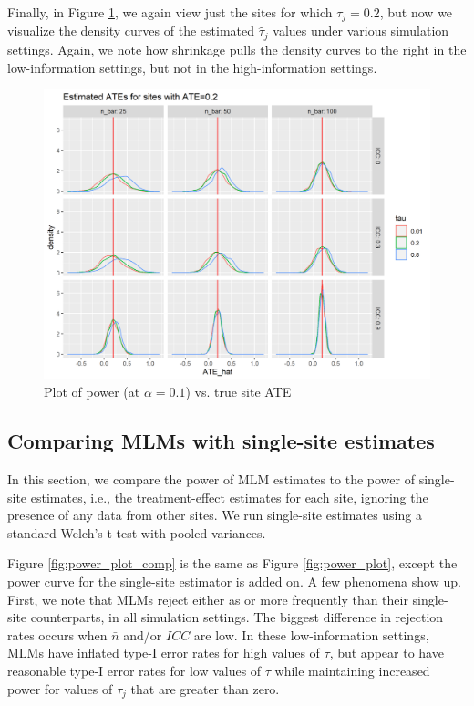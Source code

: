 \documentclass[]{article}
\begin{document}
Finally, in Figure \ref{fig:power_plot_ATE02_dens}, we again view just the sites for which $\tau_j = 0.2$, but now we visualize the density curves of the estimated $\hat{\tau}_j$ values under various simulation settings.
Again, we note how shrinkage pulls the density curves to the right in the low-information settings, but not in the high-information settings.

\begin{figure}[ht]
	\centering
	\includegraphics[width=\textwidth]{power_plot_ATE02_dens}
	\caption{Plot of power (at $\alpha = 0.1$) vs. true site ATE}
	\label{fig:power_plot_ATE02_dens}
\end{figure}


\subsection{Comparing MLMs with single-site estimates}

In this section, we compare the power of MLM estimates to the power of single-site estimates, i.e., the treatment-effect estimates for each site, ignoring the presence of any data from other sites.
We run single-site estimates using a standard Welch's t-test with pooled variances.

Figure \ref{fig:power_plot_comp} is the same as Figure \ref{fig:power_plot}, except the power curve for the single-site estimator is added on.
A few phenomena show up.
First, we note that MLMs reject either as or more frequently than their single-site counterparts, in all simulation settings.
The biggest difference in rejection rates occurs when $\bar{n}$ and/or $ICC$ are low.
In these low-information settings, MLMs have inflated type-I error rates for high values of $\tau$, but appear to have reasonable type-I error rates for low values of $\tau$ while maintaining increased power for values of $\tau_j$ that are greater than zero.
\end{document}
